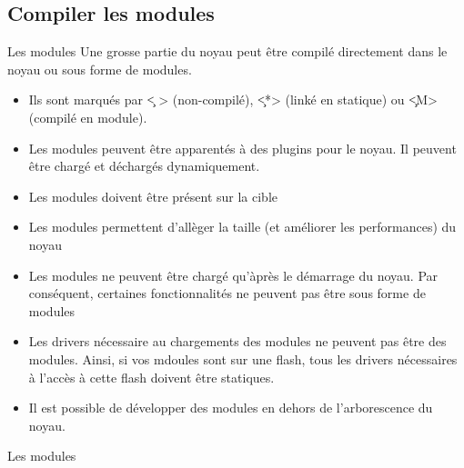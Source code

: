 \subsection{Compiler les modules}
\begin{frame}[fragile=singleslide]{Les modules}
  Une grosse  partie du  noyau peut être  compilé directement  dans le
  noyau ou sous forme de modules.
  \begin{itemize} 
  \item Ils sont marqués par  \c{< >} (non-compilé), \c{<*>} (linké en
    statique) ou \c{<M>} (compilé en module).
  \item  Les modules  peuvent être  apparentés à  des plugins  pour le
    noyau. Il peuvent être chargé et déchargés dynamiquement.
  \item Les modules doivent être présent sur la cible
  \item Les  modules permettent d'allèger la taille  (et améliorer les
    performances) du noyau
  \item Les  modules ne peuvent  être chargé qu'àprès le  démarrage du
    noyau.  Par conséquent, certaines  fonctionnalités ne  peuvent pas
    être sous forme de modules
  \item Les  drivers nécessaire au chargements des  modules ne peuvent
    pas être  des modules. Ainsi, si  vos mdoules sont  sur une flash,
    tous les drivers nécessaires à  l'accès à cette flash doivent être
    statiques.
  \item  Il  est possible  de  développer  des  modules en  dehors  de
    l'arborescence du noyau.
  \end{itemize}
\end{frame}

\begin{frame}[fragile=singleslide]{Les modules}
\end{frame} 

